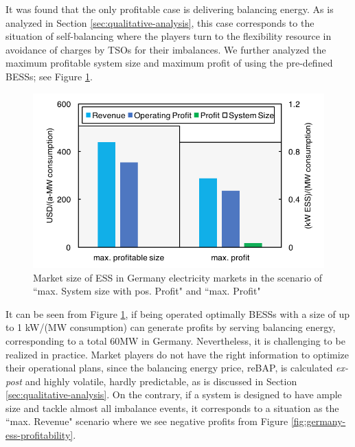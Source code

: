 It was found that the only profitable case is delivering balancing energy. As is analyzed in Section \ref{sec:qualitative-analysis}, this case corresponds to the situation of self-balancing where the players turn to the flexibility resource in avoidance of charges by TSOs for their imbalances. We further analyzed the maximum profitable system size and maximum profit of using the pre-defined BESSs; see Figure \ref{fig:germany-ess-profitable-size}.

\begin{figure}[h!]
	\centering
	\includegraphics[width=0.9\linewidth]{Figures/Germany_ESS_profitable_size}
	\caption{Market size of ESS in Germany electricity markets in the scenario of ``max. System size with pos. Profit" and ``max. Profit"}
	\label{fig:germany-ess-profitable-size}
\end{figure}

It can be seen from Figure \ref{fig:germany-ess-profitable-size}, if being operated optimally BESSs with a size of up to 1 kW/(MW consumption) can generate profits by serving balancing energy, corresponding to a total 60MW in Germany. Nevertheless, it is challenging to be realized in practice. Market players do not have the right information to optimize their operational plans, since the balancing energy price, reBAP, is calculated \textit{ex-post} and highly volatile, hardly predictable, as is discussed in Section \ref{sec:qualitative-analysis}. On the contrary, if a system is designed to have ample size and tackle almost all imbalance events, it corresponds to a situation as the ``max. Revenue" scenario where we see negative profits from Figure \ref{fig:germany-ess-profitability}.

